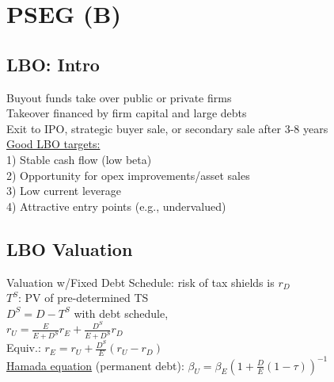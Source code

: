 \section{PSEG (B)}
	\subsection*{LBO: Intro}
	Buyout funds take over public or private firms\\
	Takeover financed by firm capital and large debts\\
	Exit to IPO, strategic buyer sale, or secondary sale after 3-8 years\\
	\underline{Good LBO targets:}\\
	1) Stable cash flow (low beta)\\
	2) Opportunity for opex improvements/asset sales\\
	3) Low current leverage\\
	4) Attractive entry points (e.g., undervalued)
	
	\subsection*{LBO Valuation}
	Valuation w/Fixed Debt Schedule: risk of tax shields is $r_{D}$\\
	$T^{S}$: PV of pre-determined TS\\
	$D^{S} = D - T^{S}$ with debt schedule,\\
	$r_{U} = \frac{E}{E + D^{S}}r_{E} + \frac{D^{S}}{E + D^{S}}r_{D}$\\
	Equiv.: $r_{E} = r_{U} + \frac{D^{S}}{E}\left(r_{U} - r_{D}\right)$\\
	\underline{Hamada equation} (permanent debt): $\beta_{U} = \beta_{E}\left(1 + \frac{D}{E}\left(1 - \tau\right)\right)^{-1}$
	